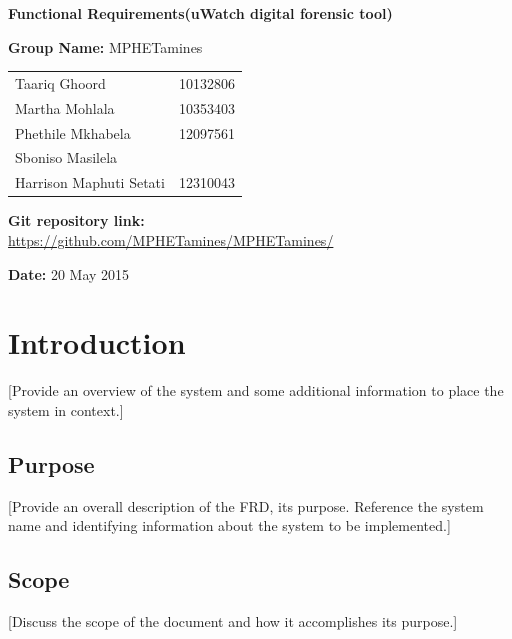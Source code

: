\documentclass[a4paper,12pt]{article}
\begin{document}
\begin{center}

\Huge\textbf{Functional Requirements(uWatch digital forensic tool)\\}
																											
\vspace{2 cm}

\LARGE\textbf{Group Name:} MPHETamines\newline
 
 
 
 
 
\vspace{0.5 cm}
\begin{tabular}{lr}
Taariq Ghoord&10132806
\\ 
Martha Mohlala&10353403
\\
Phethile Mkhabela&12097561
\\
Sboniso Masilela&%
\\
Harrison Maphuti Setati&12310043\\
\end{tabular}

\vspace{1cm}
\textbf{Git repository link:\\}
\url{https://github.com/MPHETamines/MPHETamines/}

\vspace{1cm}
\textbf{Date:} 20 May 2015
\end{center}
\newpage

\tableofcontents







\newpage
{}

\section{Introduction}
[Provide an overview of the system and some additional information to place the system in context.]
\subsection{Purpose}
[Provide an overall description of the FRD, its purpose.  Reference the system name and identifying information about the system to be implemented.]
\subsection{Scope}
[Discuss the scope of the document and how it accomplishes its purpose.]
\end{document}
